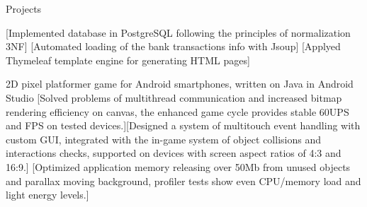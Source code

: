 \documentclass[10pt,a4paper,oneside]{letter} %
\begin{document}
	\begin{resumeSection}{Projects }

		[Implemented database in PostgreSQL following the principles of normalization 3NF]
		[Automated loading of the bank transactions info with Jsoup]
		[Applyed Thymeleaf template engine for generating HTML pages]
	    
			{2D pixel platformer game for Android smartphones, written on Java in Android Studio}
			[Solved problems of multithread communication and increased bitmap rendering efficiency on canvas, the enhanced game cycle provides stable 60UPS and FPS on tested devices.][Designed a system of multitouch event handling with custom GUI, integrated with the in-game system of object collisions and interactions checks, supported on devices with screen aspect ratios of 4:3 and 16:9.]
			[Optimized application memory releasing over 50Mb from unused objects and parallax moving background, profiler tests show even CPU/memory load and light energy levels.]
	\end{resumeSection}
	
\end{document}
